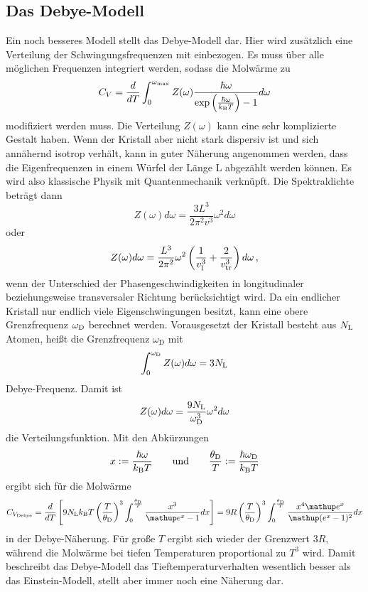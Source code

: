 \subsection{Das Debye-Modell}
Ein noch besseres Modell stellt das Debye-Modell dar. Hier wird zusätzlich eine Verteilung der Schwingungsfrequenzen mit einbezogen. Es muss über alle möglichen Frequenzen integriert werden, sodass die Molwärme zu
\begin{equation}
	C_V = \frac{d}{dT}\int_0^{\omega_\text{max}} Z(\omega) \frac{\hbar\omega}{\exp{\left(\frac{\hbar\omega}{k_\text B T}\right)} - 1} d\omega
	\label{eqn:cvn}
\end{equation}
modifiziert werden muss.
Die Verteilung $Z(\omega)$ kann eine sehr komplizierte Gestalt haben. Wenn der Kristall aber nicht stark dispersiv ist und sich annähernd isotrop verhält, kann in guter Näherung angenommen werden, dass die Eigenfrequenzen in einem Würfel der Länge L abgezählt werden können.
Es wird also klassische Physik mit Quantenmechanik verknüpft.
Die Spektraldichte beträgt dann
\begin{equation*}
	Z(\omega)d\omega = \frac{3L^3}{2\pi^2v^3}\omega^2 d\omega
\end{equation*}
oder
\begin{equation}
	Z(\omega)d\omega = \frac{L^3}{2\pi^2}\omega^2\left(\frac{1}{v_\text{l}^3}+\frac{2}{v_{\text{tr}}^3}\right)d\omega
	\label{eqn:z}\,\text,
\end{equation}
wenn der Unterschied der Phasengeschwindigkeiten in longitudinaler beziehungsweise transversaler Richtung berücksichtigt wird.
Da ein endlicher Kristall nur endlich viele Eigenschwingungen besitzt, kann eine obere Grenzfrequenz $\omega_\text D$ berechnet werden. Vorausgesetzt der Kristall besteht aus $N_\text L$ Atomen, heißt die Grenzfrequenz $\omega_\text{D}$ mit 
\begin{equation}
	\int_0^{\omega_\text D} Z(\omega) d\omega = 3 N_\text L
	\label{eqn:wd}
\end{equation}
Debye-Frequenz.
Damit ist 
\begin{equation}
	Z(\omega)d\omega = \frac{9 N_\text L}{\omega_\text D ^3}\omega^2 d\omega
	\label{eqn:z2}
\end{equation}
die Verteilungsfunktion.
Mit den Abkürzungen
\begin{equation*}
	x := \frac{\hbar\omega}{k_\text B T}\qquad\text{und}\qquad \frac{\theta_\text D}{T} :=\frac{\hbar\omega_\text D }{k_\text B T}
\end{equation*}
ergibt sich für die Molwärme
\begin{equation}
	C_{V_\text{Debye}} = \frac{d}{dT}\left[9 N_\text L k_\text B T \left(\frac{T}{\theta_\text D}\right)^3 \int_0^{\frac{\theta_\text D}{T}} \frac{x^3}{\mathup e^x -1} dx \right] = 9 R \left(\frac{T}{\theta_\text D}\right)^3 \int_0^{\frac{\theta_\text D}{T}} \frac{x^4\mathup e^x}{\mathup (e^x -1)^2} dx
	\label{eqn:cvd}
\end{equation}
in der Debye-Näherung.
Für große $T$ ergibt sich wieder der Grenzwert $3R$, während die Molwärme bei tiefen Temperaturen  proportional zu $T^3$ wird. Damit beschreibt das Debye-Modell das Tieftemperaturverhalten wesentlich besser als das Einstein-Modell, stellt aber immer noch eine Näherung dar. 
